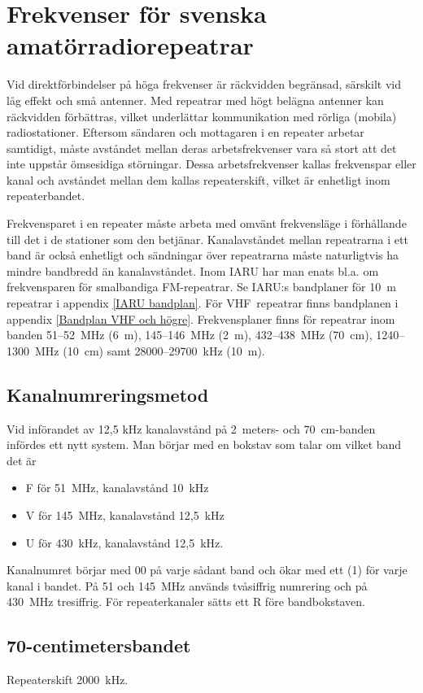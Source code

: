 \chapter{Frekvenser för svenska amatörradiorepeatrar}
\label{svenska repeatrar}

Vid direktförbindelser på höga frekvenser är räckvidden begränsad,
särskilt vid låg effekt och små antenner.
Med repeatrar med högt belägna antenner kan räckvidden förbättras,
vilket underlättar kommunikation med rörliga (mobila) radiostationer.
Eftersom sändaren och mottagaren i en repeater arbetar samtidigt, måste
avståndet mellan deras arbetsfrekvenser vara så stort att det inte uppstår
ömsesidiga störningar.
Dessa arbetsfrekvenser kallas frekvenspar eller kanal och avståndet mellan dem
kallas repeaterskift, vilket är enhetligt inom repeaterbandet.

Frekvensparet i en repeater måste arbeta med omvänt frekvensläge i förhållande
till det i de stationer som den betjänar.
Kanalavståndet mellan repeatrarna i ett band är också enhetligt och sändningar
över repeatrarna måste naturligtvis ha mindre bandbredd än kanalavståndet.
Inom IARU har man enats bl.a. om frekvensparen för smalbandiga FM-repeatrar.
Se IARU:s bandplaner för 10~m repeatrar i appendix \ref{IARU bandplan}.
För VHF~repeatrar finns bandplanen i appendix \ref{Bandplan VHF och högre}.
Frekvensplaner finns för repeatrar inom banden 51--52~MHz (6~m), 145--146~MHz
(2~m), 432--438~MHz (70~cm), 1240--1300~MHz (10~cm) samt 28000--29700~kHz (10~m).

\section{Kanalnumreringsmetod}
Vid införandet av 12,5 kHz kanalavstånd på 2~meters- och 70~cm-banden infördes
ett nytt system.
Man börjar med en bokstav som talar om vilket band det är
\begin{itemize}
  \item F för 51~MHz, kanalavstånd 10~kHz
  \item V för 145~MHz, kanalavstånd 12,5~kHz
  \item U för 430~kHz, kanalavstånd 12,5~kHz.
\end{itemize}
Kanalnumret börjar med 00 på varje sådant band och ökar med ett (1) för varje
kanal i bandet.
På 51 och 145~MHz används tvåsiffrig numrering och på 430~MHz tresiffrig.
För repeaterkanaler sätts ett R före bandbokstaven.

\section{70-centimetersbandet}
Repeaterskift 2000~kHz.

